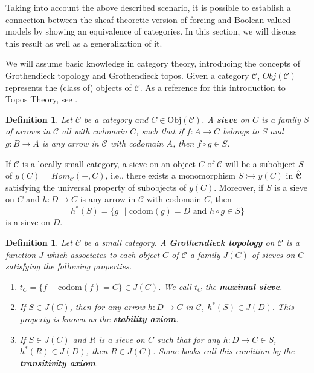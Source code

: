 \documentclass[10pt,a4paper]{amsart}
\newtheorem{Def}[Theo]{Definition}
\newcommand{\C}{\mathcal{C}}
\newcommand{\hC}{\Hat{\C}}
\begin{document}
    



 


 

Taking into account the above described  scenario, it is possible to establish a connection between the sheaf theoretic version of forcing and Boolean-valued models by showing an equivalence of categories. In this section, we will discuss this result as well as a generalization of it.

We will assume basic knowledge in category theory, introducing the concepts of Grothendieck topology and Grothendieck topos. Given a category $\C$, $Obj(\C)$ represents the (class of) objects of $\C$. As a reference for this introduction to Topos Theory, see \cite{MacMoe94}.


\begin{Def}\label{Sievedef}
	Let $\C$ be a category and $C \in \text{Obj}(\C)$. A \textbf{sieve} on $C$ is a family $S$
	of arrows in $\C$ all with codomain $C$, such that if $f: A \to C$ belongs to $S$ and $g: B \to A$ is any arrow in $\C$ with codomain $A$, then $f \circ g \in S$.
	
\end{Def}

If $\C$ is a locally small category, a sieve on an object $C$ of $\C$ will be a subobject $S$ of $y(C) = Hom_{\C}( - ,C)$, i.e., there exists a monomorphism $S \rightarrowtail y(C)$ in $\hC$ satisfying the universal property of subobjects of $y(C)$. Moreover, if $S$ is a sieve on $C$ and $h: D \to C$ is any arrow in $\C$ with codomain $C$, then 
$$h^{*}(S) = \{g\text{ }|\text{  codom}(g) = D \text{ and } h \circ g \in S\}$$
is a sieve on $D$.

\begin{Def}
	Let $\C$ be a small category. A \textbf{Grothendieck topology} on $\C$ is a function $J$ which associates to each object $C$ of $\C$ a family $J(C)$ of sieves on $C$ satisfying the following properties.
	\begin{enumerate}
		\item $t_{C} = \{ f\text{ } | \text{  codom}(f) = C\} \in J(C)$. We call $t_{C}$ the \textbf{maximal sieve}.
		
		\item If $S \in J(C)$, then for any arrow $h: D \to C$ in $\C$, $h^{*}(S) \in J(D).$ This property is known as the \textbf{stability axiom}.
		
		\item If $S \in J(C)$ and $R$ is a sieve on $C$ such that for any $h: D \to C \in S$, $h^{*}(R) \in J(D)$, then $R \in J(C)$. Some books call this condition by the \textbf{transitivity axiom}. 
	\end{enumerate}
\end{Def}
\end{document}
